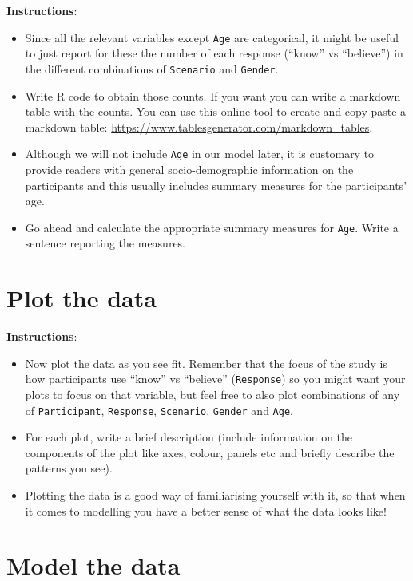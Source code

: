 \documentclass[
]{article}
\providecommand{\tightlist}{%
  \setlength{\itemsep}{0pt}\setlength{\parskip}{0pt}}
\begin{document}
\textbf{Instructions}:

\begin{itemize}
\tightlist
\item
  Since all the relevant variables except \texttt{Age} are categorical,
  it might be useful to just report for these the number of each
  response (``know'' vs ``believe'') in the different combinations of
  \texttt{Scenario} and \texttt{Gender}.
\item
  Write R code to obtain those counts. If you want you can write a
  markdown table with the counts. You can use this online tool to create
  and copy-paste a markdown table:
  \url{https://www.tablesgenerator.com/markdown_tables}.
\item
  Although we will not include \texttt{Age} in our model later, it is
  customary to provide readers with general socio-demographic
  information on the participants and this usually includes summary
  measures for the participants' age.
\item
  Go ahead and calculate the appropriate summary measures for
  \texttt{Age}. Write a sentence reporting the measures.
\end{itemize}

\section{Plot the data}\label{plot-the-data}

\textbf{Instructions}:

\begin{itemize}
\tightlist
\item
  Now plot the data as you see fit. Remember that the focus of the study
  is how participants use ``know'' vs ``believe'' (\texttt{Response}) so
  you might want your plots to focus on that variable, but feel free to
  also plot combinations of any of \texttt{Participant},
  \texttt{Response}, \texttt{Scenario}, \texttt{Gender} and
  \texttt{Age}.
\item
  For each plot, write a brief description (include information on the
  components of the plot like axes, colour, panels etc and briefly
  describe the patterns you see).
\item
  Plotting the data is a good way of familiarising yourself with it, so
  that when it comes to modelling you have a better sense of what the
  data looks like!
\end{itemize}

\section{Model the data}\label{model-the-data}
\end{document}
